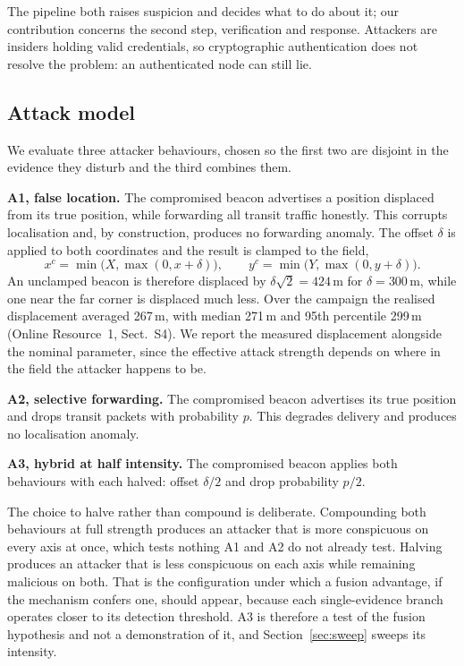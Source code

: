 \documentclass[pdflatex,sn-mathphys-num]{sn-jnl}%
\theoremstyle{thmstyleone}%
\theoremstyle{thmstyletwo}%
\theoremstyle{thmstylethree}%
\begin{document}
The pipeline both raises suspicion and decides what to do about it; our
contribution concerns the second step, verification and response. Attackers are insiders
holding valid credentials, so cryptographic authentication does not resolve
the problem: an authenticated node can still lie.

\subsection{Attack model}

We evaluate three attacker behaviours, chosen so the first two are disjoint
in the evidence they disturb and the third combines them.

\textbf{A1, false location.} The compromised beacon advertises a position
displaced from its true position, while forwarding all transit traffic
honestly. This corrupts localisation and, by construction, produces no
forwarding anomaly. The offset $\delta$ is applied to both coordinates and
the result is clamped to the field,
\begin{equation}
\label{eq:clamp}
x^{c} = \min\bigl(X, \max(0, x + \delta)\bigr), \qquad
y^{c} = \min\bigl(Y, \max(0, y + \delta)\bigr).
\end{equation}
An unclamped beacon is therefore displaced by $\delta\sqrt{2} = 424$\,m for
$\delta = 300$\,m, while one near the far corner is displaced much less.
Over the campaign the realised displacement averaged 267\,m, with median
271\,m and 95th percentile 299\,m (Online Resource~1, Sect.~S4). We report the
measured displacement alongside the nominal parameter, since the effective
attack strength depends on where in the field the attacker happens to be.

\textbf{A2, selective forwarding.} The compromised beacon advertises its true
position and drops transit packets with probability $p$. This degrades
delivery and produces no localisation anomaly.

\textbf{A3, hybrid at half intensity.} The compromised beacon applies both
behaviours with each halved: offset $\delta/2$ and drop probability $p/2$.

The choice to halve rather than compound is deliberate. Compounding both
behaviours at full strength produces an attacker that is more conspicuous on
every axis at once, which tests nothing A1 and A2 do not already test.
Halving produces an attacker that is less conspicuous on each axis while
remaining malicious on both. That is the configuration under which a fusion
advantage, if the mechanism confers one, should appear, because each
single-evidence branch operates closer to its detection threshold. A3 is
therefore a test of the fusion hypothesis and not a demonstration of it,
and Section~\ref{sec:sweep} sweeps its intensity.
\end{document}
